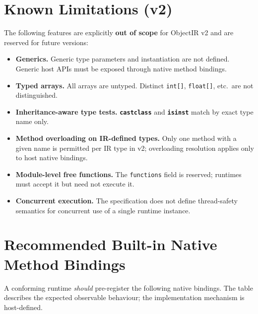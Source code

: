 \documentclass[11pt,a4paper]{article}
\newcommand{\opcode}[1]{\textbf{\texttt{#1}}}
\begin{document}
\section{Known Limitations (v2)}
\label{sec:limits}

The following features are explicitly \textbf{out of scope} for ObjectIR v2
and are reserved for future versions:

\begin{itemize}[leftmargin=1.8em]
  \item \textbf{Generics.} Generic type parameters and instantiation are not
    defined. Generic host APIs must be exposed through native method bindings.
  \item \textbf{Typed arrays.} All arrays are untyped. Distinct
    \texttt{int[]}, \texttt{float[]}, etc.\ are not distinguished.
  \item \textbf{Inheritance-aware type tests.} \opcode{castclass} and
    \opcode{isinst} match by exact type name only.
  \item \textbf{Method overloading on IR-defined types.} Only one method
    with a given name is permitted per IR type in v2; overloading resolution
    applies only to host native bindings.
  \item \textbf{Module-level free functions.} The \texttt{functions} field is
    reserved; runtimes must accept it but need not execute it.
  \item \textbf{Concurrent execution.} The specification does not define
    thread-safety semantics for concurrent use of a single runtime instance.
\end{itemize}

\appendix

\section{Recommended Built-in Native Method Bindings}
\label{app:builtins}

A conforming runtime \textit{should} pre-register the following native
bindings. The table describes the expected observable behaviour; the
implementation mechanism is host-defined.
\end{document}
